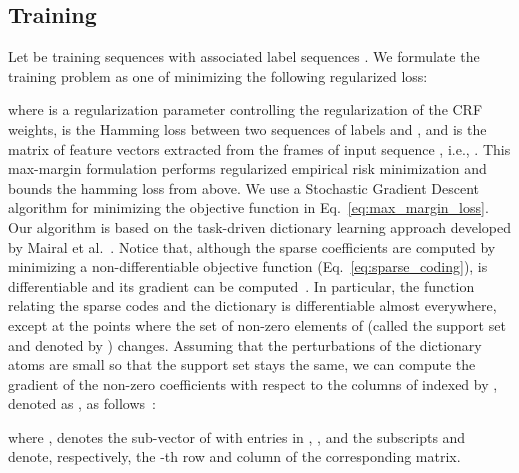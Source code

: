 \documentclass[10pt,twocolumn,letterpaper]{article}
\begin{document}
\subsection{Training}
Let  be  training sequences with associated label sequences . We formulate the training problem as one of minimizing the following regularized loss:

where  is a regularization parameter controlling the regularization of the CRF weights,  is the Hamming loss between two sequences of labels  and , and  is the matrix of feature vectors extracted from the frames of input sequence , i.e., . This max-margin formulation performs regularized empirical risk minimization and bounds the hamming loss from above. We use a Stochastic Gradient Descent algorithm for minimizing the objective function in Eq.~\eqref{eq:max_margin_loss}. Our algorithm is based on the task-driven dictionary learning approach developed by Mairal et al.~\cite{Mairal:NIPS09}. Notice that, although the sparse coefficients are computed by minimizing a non-differentiable objective function (Eq.~\ref{eq:sparse_coding}),  is differentiable and its gradient can be computed~\cite{Mairal:PAMI12}. In particular, the function relating the sparse codes  and the dictionary is differentiable almost everywhere, except at the points where the set of non-zero elements of  (called the support set and denoted by ) changes. Assuming that the perturbations of the dictionary atoms are small so that the support set stays the same, we can compute the gradient of the non-zero coefficients with respect to the columns of  indexed by , denoted as , as follows~\cite{Tao:ECCV14}:

where ,  denotes the sub-vector of  with entries in , , and the subscripts  and  denote, respectively, the -th row and column of the corresponding matrix. 
\end{document}
